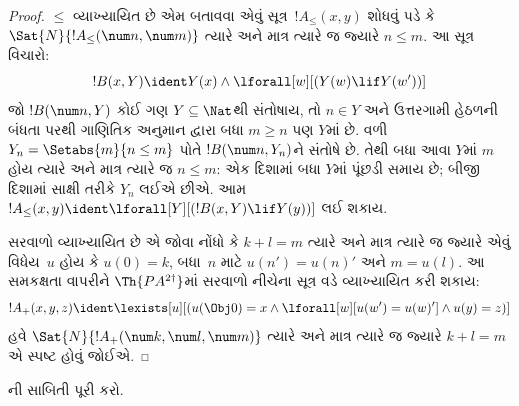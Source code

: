 \documentclass[../../../include/open-logic-section]{subfiles}
\begin{document}
\begin{proof}
$\le$ વ્યાખ્યાયિત છે એમ બતાવવા એવું સૂત્ર~$!A_\le(x, y)$ શોધવું
પડે કે $\Sat{N}{!A_\le(\num n, \num m)}$ ત્યારે અને માત્ર ત્યારે જ
જ્યારે $n \le m$. આ સૂત્ર વિચારો:
\[
!B(x, Y) \ident Y(x) \land \lforall[w][(Y(w) \lif Y(w'))]
\]
જો $!B(\num n, Y)$ કોઈ ગણ $Y \subseteq \Nat$થી સંતોષાય, તો
$n\in Y$ અને ઉત્તરગામી હેઠળની બંધતા પરથી ગાણિતિક અનુમાન દ્વારા
બધા $m\ge n$ પણ $Y$માં છે. વળી $Y_n=\Setabs{m}{n\le m}$ પોતે
$!B(\num n,Y_n)$ને સંતોષે છે. તેથી બધા આવા $Y$માં $m$ હોય
ત્યારે અને માત્ર ત્યારે જ $n\le m$: એક દિશામાં બધા $Y$માં પૂંછડી
સમાય છે; બીજી દિશામાં સાક્ષી તરીકે $Y_n$ લઈએ છીએ.
આમ $!A_\le(x, y) \ident
\lforall[Y][(!B(x, Y) \lif Y(y))]$ લઈ શકાય.

સરવાળો વ્યાખ્યાયિત છે એ જોવા નોંધો કે $k+l=m$ ત્યારે અને માત્ર ત્યારે
જ જ્યારે એવું વિધેય~$u$ હોય કે $u(0)=k$, બધા~$n$ માટે
$u(n')=u(n)'$ અને $m = u(l)$. આ સમકક્ષતા વાપરીને
$\Th{PA^{2\dagger}}$માં સરવાળો નીચેના સૂત્ર વડે વ્યાખ્યાયિત કરી
શકાય:
\[
!A_+(x,y,z) \ident \lexists[u][(u(\Obj 0)=x \land \lforall[w][u(w')=u
 (w)'] \land u(y)=z)]
\]
હવે $\Sat{N}{!A_+(\num k, \num l, \num m)}$ ત્યારે અને માત્ર
ત્યારે જ જ્યારે $k+l=m$ એ સ્પષ્ટ હોવું જોઈએ.
\end{proof}

\begin{prob}
ની સાબિતી પૂરી કરો.
\end{prob}
\end{document}
